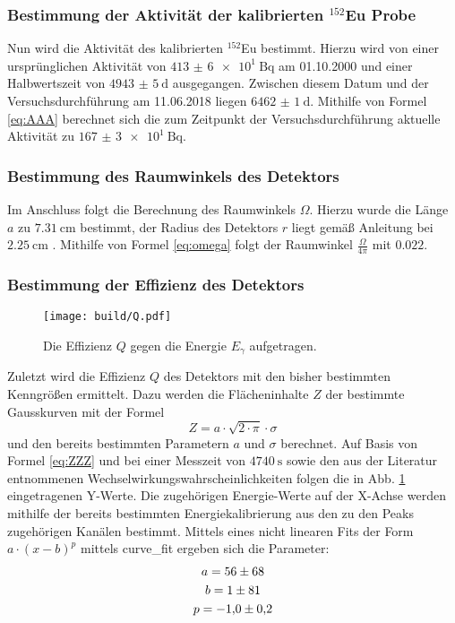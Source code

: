 \subsubsection{Bestimmung der Aktivität der kalibrierten $^{152}$Eu Probe}

Nun wird die Aktivität des kalibrierten $^{152}$Eu bestimmt. Hierzu wird von einer ursprünglichen Aktivität von $\SI{413(6)e1}{\becquerel}$ am 01.10.2000 und einer Halbwertszeit von $\SI{4943(5)}{\day}$ \cite{V18} ausgegangen. Zwischen diesem Datum und der Versuchsdurchführung am 11.06.2018 liegen $\SI{6462(1)}{\day}$. Mithilfe von Formel \eqref{eq:AAA} berechnet sich die zum Zeitpunkt der Versuchsdurchführung aktuelle Aktivität zu $\SI{167(3)e1}{\becquerel}$.
\subsubsection{Bestimmung des Raumwinkels des Detektors}
Im Anschluss folgt die Berechnung des Raumwinkels $\Omega$. Hierzu wurde die Länge $a$ zu $\SI{7.31}{\centi\meter}$ bestimmt, der Radius des Detektors $r$ liegt gemäß Anleitung bei $\SI{2.25}{\centi\meter}$ \cite{V18}. Mithilfe von Formel \eqref{eq:omega} folgt der Raumwinkel $\frac{\Omega}{4 \pi}$ mit $0.022$.
\subsubsection{Bestimmung der Effizienz des Detektors}
\begin{figure}
	\centering
	\texttt{[image: build/Q.pdf]}
	\caption{Die Effizienz $Q$ gegen die Energie $E_\gamma$ aufgetragen.}
	\label{fig:Q}
\end{figure}
Zuletzt wird die Effizienz $Q$ des Detektors mit den bisher bestimmten Kenngrößen ermittelt. Dazu werden die Flächeninhalte $Z$ der bestimmte Gausskurven mit der Formel 
\begin{equation}
    Z = a \cdot \sqrt{2 \cdot \pi} \cdot \sigma \label{eq:flach}
\end{equation}
und den bereits bestimmten Parametern $a$ und $\sigma$ berechnet. Auf Basis von Formel \eqref{eq:ZZZ} und bei einer Messzeit von $\SI{4740}{\second}$ sowie den aus der Literatur entnommenen Wechselwirkungswahrscheinlichkeiten \cite{Eu152} folgen die in Abb. \ref{fig:Q} eingetragenen Y-Werte. Die zugehörigen Energie-Werte auf der X-Achse werden mithilfe der bereits bestimmten Energiekalibrierung aus den zu den Peaks zugehörigen Kanälen bestimmt. Mittels eines nicht linearen Fits der Form $a \cdot (x-b)^p$ mittels curve\_fit \cite{scipy} ergeben sich die Parameter:
\begin{gather*}
    a = \num{56 \pm 68}\\
    b = \num{1\pm 81}\\
    p = \num{-1.0 \pm 0.2}
\end{gather*}

